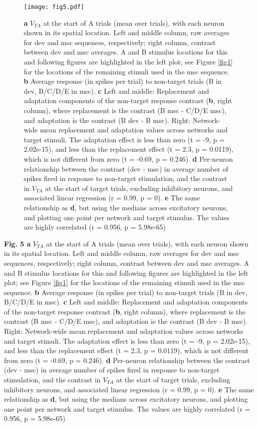 \documentclass[pdflatex,referee,iicol,sn-basic]{sn-jnl}
\theoremstyle{thmstyleone}%
\theoremstyle{thmstyletwo}%
\theoremstyle{thmstylethree}%
\begin{document}
\begin{figure*}%
    \centering
    \texttt{[image: fig5.pdf]}
    \caption{\textbf{a} $V_{TA}$ at the start of A trials (mean over trials), with each neuron shown in its spatial location. Left and middle column, raw averages for dev and msc sequences, respectively; right column, contrast between dev and msc averages. A and B stimulus locations for this and following figures are highlighted in the left plot; see Figure \ref{fig1} for the locations of the remaining stimuli used in the msc sequence. \textbf{b} Average response (in spikes per trial) to non-target trials (B in dev, B/C/D/E in msc). \textbf{c} Left and middle: Replacement and adaptation components of the non-target response contrast (\textbf{b}, right column), where replacement is the contrast (B msc - C/D/E msc), and adaptation is the contrast (B dev - B msc). Right: Network-wide mean replacement and adaptation values across networks and target stimuli. The adaptation effect is less than zero (t = -9, p = 2.02e-15), and less than the replacement effect (t = 2.3, p = 0.0119), which is not different from zero (t = -0.69, p = 0.246). \textbf{d} Per-neuron relationship between the contrast (dev - msc) in average number of spikes fired in response to non-target stimulation, and the contrast in $V_{TA}$ at the start of target trials, excluding inhibitory neurons, and associated linear regression (r = 0.99, p = 0). \textbf{e} The same relationship as \textbf{d}, but using the medians across excitatory neurons, and plotting one point per network and target stimulus. The values are highly correlated (r = 0.956, p = 5.98e-65)}
    \label{fig5}
\end{figure*}

\textbf{Fig. 5 a} $V_{TA}$ at the start of A trials (mean over trials), with each neuron shown in its spatial location. Left and middle column, raw averages for dev and msc sequences, respectively; right column, contrast between dev and msc averages. A and B stimulus locations for this and following figures are highlighted in the left plot; see Figure \ref{fig1} for the locations of the remaining stimuli used in the msc sequence. \textbf{b} Average response (in spikes per trial) to non-target trials (B in dev, B/C/D/E in msc). \textbf{c} Left and middle: Replacement and adaptation components of the non-target response contrast (\textbf{b}, right column), where replacement is the contrast (B msc - C/D/E msc), and adaptation is the contrast (B dev - B msc). Right: Network-wide mean replacement and adaptation values across networks and target stimuli. The adaptation effect is less than zero (t = -9, p = 2.02e-15), and less than the replacement effect (t = 2.3, p = 0.0119), which is not different from zero (t = -0.69, p = 0.246). \textbf{d} Per-neuron relationship between the contrast (dev - msc) in average number of spikes fired in response to non-target stimulation, and the contrast in $V_{TA}$ at the start of target trials, excluding inhibitory neurons, and associated linear regression (r = 0.99, p = 0). \textbf{e} The same relationship as \textbf{d}, but using the medians across excitatory neurons, and plotting one point per network and target stimulus. The values are highly correlated (r = 0.956, p = 5.98e-65)
\end{document}
